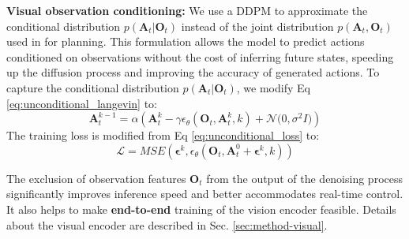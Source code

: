\documentclass[Afour,sageh,times]{sagej}
\begin{document}
\textbf{Visual observation conditioning:}
We use a DDPM to approximate the conditional distribution $p(\mathbf{A}_t | \mathbf{O}_t)$ instead of the joint distribution $p(\mathbf{A}_t,\mathbf{O}_t)$ used in \citet{janner2022diffuser} for planning. This formulation allows the model to predict actions conditioned on observations without the cost of inferring future states, speeding up the diffusion process and improving the accuracy of generated actions.
To capture the conditional distribution $p(\mathbf{A}_t |\mathbf{O}_t)$, we modify Eq \ref{eq:unconditional_langevin} to:
\begin{equation}
    \label{eq:diffusion_policy_langevin}
    \mathbf{A}^{k-1}_t = \alpha(\mathbf{A}^k_t - \gamma\epsilon_\theta(\mathbf{O}_t,\mathbf{A}^k_t,k) + \mathcal{N} \bigl(0, \sigma^2 I \bigl))
\end{equation}
The training loss is modified from Eq \ref{eq:unconditional_loss} to:
\begin{equation}
    \label{eq:diffusion_policy_loss}
    \mathcal{L}=MSE(\mathbf{\epsilon}^k,\epsilon_\theta(\mathbf{O}_t, \mathbf{A}^0_t + \mathbf{\epsilon}^k, k))
\end{equation}

The exclusion of observation features $\mathbf{O}_t$ from the output of the denoising process significantly improves inference speed and better accommodates real-time control. It also helps to make \textbf{end-to-end} training of the vision encoder feasible.
Details about the visual encoder are described in Sec. \ref{sec:method-visual}.
\end{document}
